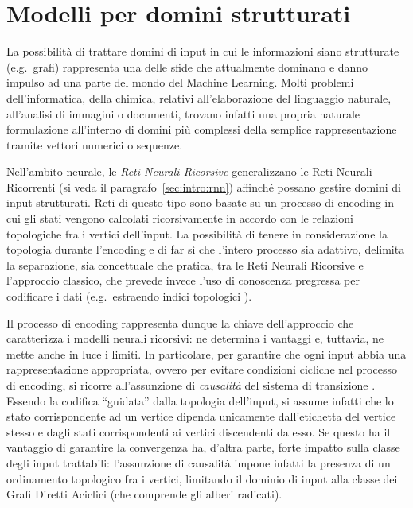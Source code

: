 \section{Modelli per domini strutturati}\label{sec:intro:struct}
La possibilità di trattare domini di input in cui le informazioni siano strutturate (e.g.\ grafi) rappresenta una delle sfide che attualmente dominano e danno impulso ad una parte del mondo del Machine Learning. Molti problemi dell'informatica, della chimica, relativi all'elaborazione del linguaggio naturale, all'analisi di immagini o documenti, trovano infatti una propria naturale formulazione all'interno di domini più complessi della semplice rappresentazione tramite vettori numerici o sequenze. 

Nell'ambito neurale, le \emph{Reti Neurali Ricorsive} \cite{Frasconi:AGeneralFramework, Sperduti:SupervisedNeuralNetworks} generalizzano le Reti Neurali Ricorrenti (si veda il paragrafo~\ref{sec:intro:rnn}) affinché possano gestire domini di input strutturati. Reti di questo tipo sono basate su un processo di encoding in cui gli stati vengono calcolati ricorsivamente in accordo con le relazioni topologiche fra i vertici dell'input. La possibilità di tenere in considerazione la topologia durante l'encoding e di far sì che l'intero processo sia adattivo, delimita la separazione, sia concettuale che pratica, tra le Reti Neurali Ricorsive e l'approccio classico, che prevede invece l'uso di conoscenza pregressa per codificare i dati (e.g.\ estraendo indici topologici \cite{Hall:TheMolecularConnectivity}).

Il processo di encoding rappresenta dunque la chiave dell'approccio che caratterizza i modelli neurali ricorsivi: ne determina i vantaggi e, tuttavia, ne mette anche in luce i limiti. In particolare, per garantire che ogni input abbia una rappresentazione appropriata, ovvero per evitare condizioni cicliche nel processo di encoding, si ricorre all'assunzione di \emph{causalità} del sistema di transizione \cite{Sperduti:SupervisedNeuralNetworks}. Essendo la codifica ``guidata'' dalla topologia dell'input, si assume infatti che lo stato corrispondente ad un vertice dipenda unicamente dall'etichetta del vertice stesso e dagli stati corrispondenti ai vertici discendenti da esso. Se questo ha il vantaggio di garantire la convergenza ha, d'altra parte, forte impatto sulla classe degli input trattabili: l'assunzione di causalità impone infatti la presenza di un ordinamento topologico fra i vertici, limitando il dominio di input alla classe dei Grafi Diretti Aciclici (che comprende gli alberi radicati).

